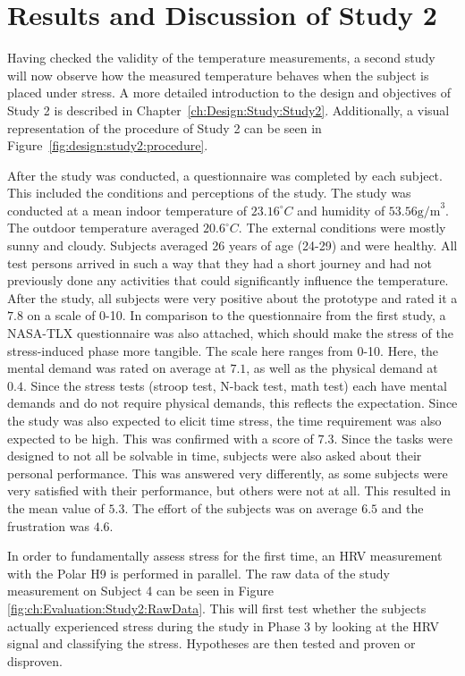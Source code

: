 \section{Results and Discussion of Study 2}
\label{sec:Evaluation:Study2}
Having checked the validity of the temperature measurements, a second study will now observe how the measured temperature behaves when the subject is placed under stress.
A more detailed introduction to the design and objectives of Study 2 is described in Chapter~\ref{ch:Design:Study:Study2}.
Additionally, a visual representation of the procedure of Study 2 can be seen in Figure~\ref{fig:design:study2:procedure}.

After the study was conducted, a questionnaire was completed by each subject. 
This included the conditions and perceptions of the study. 
The study was conducted at a mean indoor temperature of $23.16 ^\circ C$ and humidity of $53.56 \text{g/m}^3$. 
The outdoor temperature averaged $20.6 ^\circ C$.
The external conditions were mostly sunny and cloudy.
Subjects averaged 26 years of age (24-29) and were healthy.
All test persons arrived in such a way that they had a short journey and had not previously done any activities that could significantly influence the temperature.
After the study, all subjects were very positive about the prototype and rated it a $7.8$ on a scale of 0-10.
In comparison to the questionnaire from the first study, a NASA-TLX questionnaire was also attached, which should make the stress of the stress-induced phase more tangible.
The scale here ranges from 0-10.
Here, the mental demand was rated on average at $7.1$, as well as the physical demand at $0.4$. 
Since the stress tests (stroop test, N-back test, math test) each have mental demands and do not require physical demands, this reflects the expectation.
Since the study was also expected to elicit time stress, the time requirement was also expected to be high.
This was confirmed with a score of $7.3$.
Since the tasks were designed to not all be solvable in time, subjects were also asked about their personal performance.
This was answered very differently, as some subjects were very satisfied with their performance, but others were not at all. 
This resulted in the mean value of $5.3$.
The effort of the subjects was on average $6.5$ and the frustration was $4.6$.

In order to fundamentally assess stress for the first time, an HRV measurement with the Polar H9 is performed in parallel.
The raw data of the study measurement on Subject 4 can be seen in Figure \ref{fig:ch:Evaluation:Study2:RawData}.
This will first test whether the subjects actually experienced stress during the study in Phase 3 by looking at the HRV signal and classifying the stress.
Hypotheses are then tested and proven or disproven.

